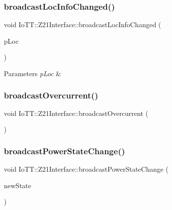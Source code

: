 \subsubsection{\texorpdfstring{broadcast\+Loc\+Info\+Changed()}{broadcastLocInfoChanged()}}
{\footnotesize\ttfamily void Io\+T\+T\+::\+Z21\+Interface\+::broadcast\+Loc\+Info\+Changed (\begin{DoxyParamCaption}\item[{\hyperlink{classIoTT_1_1LocDecoder}{Loc\+Decoder} $\ast$}]{p\+Loc }\end{DoxyParamCaption})}


\begin{DoxyParams}{Parameters}
{\em p\+Loc} & \\
\hline
\end{DoxyParams}
\mbox{\label{classIoTT_1_1Z21Interface_a55b1ca4967ca8e7771f06789e9672cfa}} 
\subsubsection{\texorpdfstring{broadcast\+Overcurrent()}{broadcastOvercurrent()}}
{\footnotesize\ttfamily void Io\+T\+T\+::\+Z21\+Interface\+::broadcast\+Overcurrent (\begin{DoxyParamCaption}\item[{void}]{ }\end{DoxyParamCaption})}

\mbox{\label{classIoTT_1_1Z21Interface_aacab731304b340d69606b397a62a83aa}} 
\subsubsection{\texorpdfstring{broadcast\+Power\+State\+Change()}{broadcastPowerStateChange()}}
{\footnotesize\ttfamily void Io\+T\+T\+::\+Z21\+Interface\+::broadcast\+Power\+State\+Change (\begin{DoxyParamCaption}\item[{const bool \&}]{new\+State }\end{DoxyParamCaption})}


